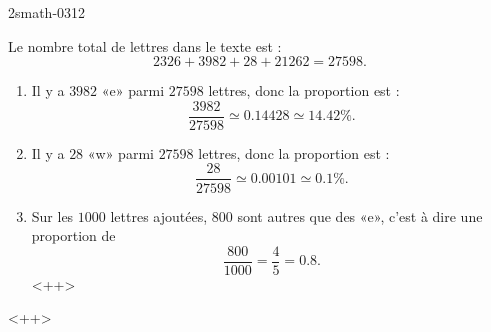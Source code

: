 
\begin{corrige}{2smath-0312}

    Le nombre total de lettres dans le texte est :
    \begin{equation}
        2326+3982+28+21262=27598.
    \end{equation}
    \begin{enumerate}
        \item
            Il y a \( 3982\) «e» parmi \( 27598\) lettres, donc la proportion est :
            \begin{equation}
                \frac{ 3982 }{ 27598 }\simeq 0.14428\simeq 14.42\%.
            \end{equation}
        \item
            Il y a \( 28\) «w» parmi \( 27598\) lettres, donc la proportion est :
            \begin{equation}
                \frac{ 28 }{ 27598 }\simeq 0.00101\simeq 0.1\%.
            \end{equation}
        \item
            Sur les \( 1000\) lettres ajoutées, \( 800\) sont autres que des «e», c'est à dire une proportion de
            \begin{equation}
                \frac{ 800 }{ 1000 }=\frac{ 4 }{ 5 }=0.8.
            \end{equation}
            <++>
    \end{enumerate}
    <++>

\end{corrige}

